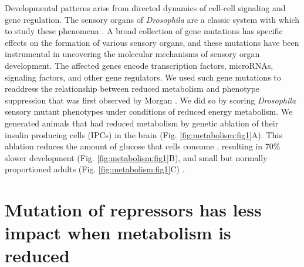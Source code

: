 Developmental patterns arise from directed dynamics of cell-cell signaling and gene regulation. The sensory organs of \textit{Drosophila} are a classic system with which to study these phenomena \cite{Quan2005}. A broad collection of gene mutations has specific effects on the formation of various sensory organs, and these mutations have been instrumental in uncovering the molecular mechanisms of sensory organ development. The affected genes encode transcription factors, microRNAs, signaling factors, and other gene regulators. We used such gene mutations to readdress the relationship between reduced metabolism and phenotype suppression that was first observed by Morgan \cite{Morgan1915,Morgan1929}. We did so by scoring \textit{Drosophila} sensory mutant phenotypes under conditions of reduced energy metabolism. We generated animals that had reduced metabolism by genetic ablation of their insulin producing cells (IPCs) in the brain (Fig. \ref{fig:metabolism:fig1}A). This ablation reduces the amount of glucose that cells consume \cite{Rulifson2002}, resulting in 70\% slower development (Fig. \ref{fig:metabolism:fig1}B), and small but normally proportioned adults (Fig. \ref{fig:metabolism:fig1}C) \cite{Rulifson2002}.

\section{Mutation of repressors has less impact when metabolism is reduced}


